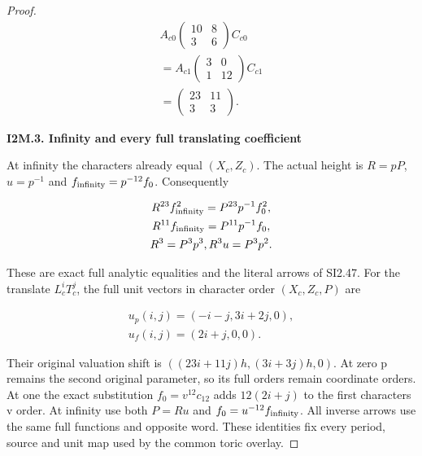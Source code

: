 \begin{proof}
\[
\begin{gathered}
A_{c0} \begin{pmatrix}10&8\\3&6\end{pmatrix} C_{c0} \\
= A_{c1} \begin{pmatrix}3&0\\1&12\end{pmatrix} C_{c1} \\
= \begin{pmatrix}23&11\\3&3\end{pmatrix}.
\end{gathered}
\]

\par

\medskip\noindent\textbf{I2M.3. Infinity and every full translating coefficient}

\par\nobreak

At infinity the characters already equal \((X_c,Z_c)\). The actual
height is \(R=pP\), \(u=p^{-1}\) and \(f_{\rm infinity}=p^{-12} f_{0}\). Consequently

\[
\begin{gathered}
R^{23} f_{\rm infinity}^{2}=P^{23} p^{-1} f_{0}^{2}, \\
R^{11} f_{\rm infinity}=P^{11} p^{-1} f_{0}, \\
R^{3}=P^{3}p^{3}, R^{3}u=P^{3}p^{2}.
\end{gathered}
\]

These are exact full analytic equalities and the literal
arrows of SI2.47. For the translate \(L_c^i T_c^j\), the full unit
vectors in character order \((X_c,Z_c,P)\) are

\[
\begin{gathered}
u_p(i,j)=(-i-j,3i+2j,0), \\
u_f(i,j)=(2i+j,0,0).
\end{gathered}
\]

Their original valuation shift is \(((23i+11j)h,(3i+3j)h,0)\).
At zero p remains the second original parameter, so its full
orders remain coordinate orders. At one the exact substitution
\(f_{0}=v^{12} c_{12}\) adds \(12(2i+j)\) to the first character\textquotesingle s v order.
At infinity use both \(P=Ru\) and \(f_{0}=u^{-12} f_{\rm infinity}\). All inverse
arrows use the same full functions and opposite word. These
identities fix every period, source and unit map used by the
common toric overlay.



\end{proof}
